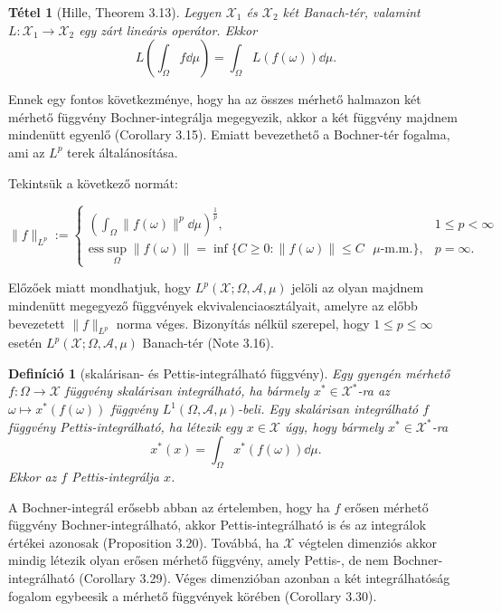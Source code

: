 \documentclass[handout]{beamer} %
\newtheorem{theo}[lem]{Tétel}
\newtheorem{defi}[lem]{Definíció}
\begin{document}
\begin{frame}
\justifying
\begin{theo}[Hille, Theorem 3.13] Legyen $\mathcal{X}_1$ és $\mathcal{X}_2$ két Banach-tér, valamint $L \colon \mathcal{X}_1 \to \mathcal{X}_2$ egy zárt lineáris operátor. Ekkor
$$L\left(\int_{\Omega} f \dd{\mu} \right) = \int_{\Omega} L(f(\omega)) \dd{\mu}.$$
\end{theo}
Ennek egy fontos következménye, hogy ha az összes mérhető halmazon két mérhető függvény Bochner-integrálja megegyezik, akkor a két függvény majdnem mindenütt egyenlő (Corollary 3.15). Emiatt bevezethető a Bochner-tér fogalma, ami az $L^p$ terek általánosítása.

Tekintsük a következő normát:

\begin{displaymath}
 \| f \|_{L^p} := \left\{
    \begin{array}{ll}
      \left(\int_{\Omega} \| f(\omega) \|^p  \dd{\mu} \right)^{\frac{1}{p}}, &  1 \leqslant p < \infty \\
      \mathrm{ess}\sup_{\Omega} \|f(\omega)\| = \inf \lbrace C \geqslant 0 : \|f(\omega)\| \leqslant C \text{ $\mu$-m.m.} \rbrace, &  p = \infty.
    \end{array}
  \right.
\end{displaymath}
\end{frame}

\begin{frame} 
\justifying
Előzőek miatt mondhatjuk, hogy $L^p(\mathcal{X}; \Omega, \mathcal{A}, \mu)$ jelöli az olyan majdnem mindenütt megegyező függvények ekvivalenciaosztályait, amelyre az előbb bevezetett $\| f \|_{L^p}$ norma véges. Bizonyítás nélkül szerepel, hogy $1 \leqslant p \leqslant \infty$ esetén $L^p(\mathcal{X}; \Omega, \mathcal{A}, \mu)$ Banach-tér (Note 3.16).
\end{frame}

\begin{frame}
\justifying
\begin{defi}[skalárisan- és Pettis-integrálható függvény] Egy gyengén mérhető $f \colon \Omega \to \mathcal{X}$ függvény skalárisan integrálható, ha bármely $x^* \in \mathcal{X}^*$-ra az $\omega \mapsto x^*(f(\omega))$ függvény $L^1(\Omega, \mathcal{A},\mu)$-beli. Egy skalárisan integrálható $f$ függvény Pettis-integrálható, ha létezik egy $x \in \mathcal{X}$ úgy, hogy bármely $x^* \in \mathcal{X}^*$-ra
$$x^*(x) = \int_{\Omega} x^*(f(\omega))\dd{\mu}.$$
Ekkor az $f$ Pettis-integrálja $x$.
\end{defi}
A Bochner-integrál erősebb abban az értelemben, hogy ha $f$ erősen mérhető függvény Bochner-integrálható, akkor Pettis-integrálható is és az integrálok értékei azonosak (Proposition 3.20). Továbbá, ha $\mathcal{X}$ végtelen dimenziós akkor mindig létezik olyan erősen mérhető függvény, amely Pettis-, de nem Bochner-integrálható (Corollary 3.29). Véges dimenzióban azonban a két integrálhatóság fogalom egybeesik a mérhető függvények körében (Corollary 3.30).
\end{frame}
\end{document}
